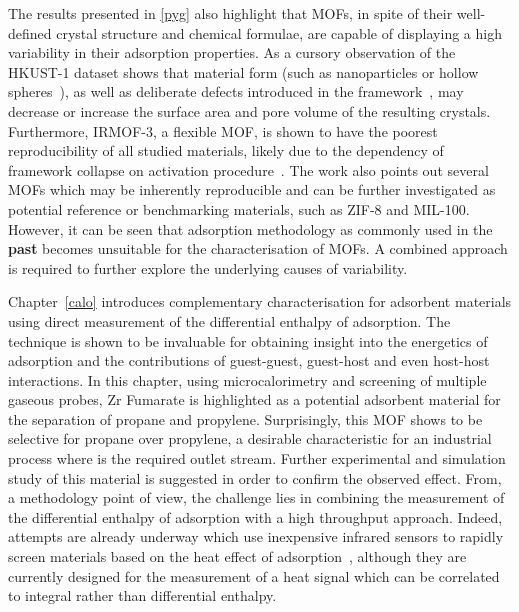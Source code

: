 The results presented in \autoref{pyg} also highlight that
\glspl{MOF}, in spite of their well-defined crystal structure and 
chemical formulae, are capable of displaying a high variability in
their adsorption properties. 
As a cursory observation of the HKUST-1 dataset shows that material 
form (such as nanoparticles or hollow
spheres~\cite{liControllableSynthesisMetal2013}), as well as 
deliberate defects introduced in the 
framework~\cite{barinDefectCreationLinker2014}, may decrease or 
increase the surface area and pore volume of the resulting crystals.
Furthermore, IRMOF-3, a flexible \gls{MOF}, 
is shown to have the poorest reproducibility of all studied materials,
likely due to the dependency of framework collapse on 
activation procedure~\cite{engelActivationDependentBreathingFlexible2017}.
The work also points out several \glspl{MOF} 
which may be inherently reproducible and can be further investigated as 
potential reference or benchmarking materials, such as 
ZIF-8 and MIL-100.
However, it can be seen that adsorption methodology as commonly used in the
\textbf{past} becomes unsuitable for the characterisation of \glspl{MOF}. 
A combined approach is required to further explore the underlying 
causes of variability.

Chapter~\ref{calo} introduces complementary characterisation 
for adsorbent materials using direct measurement of the
differential enthalpy of adsorption. The technique is shown to be 
invaluable for obtaining insight into the energetics of 
adsorption and the contributions of guest-guest, guest-host 
and even host-host interactions. In this chapter,
using microcalorimetry and screening of multiple gaseous probes,
Zr Fumarate is highlighted as a potential adsorbent material for the 
separation of propane and propylene. Surprisingly, this \gls{MOF} shows
to be selective for propane over propylene, a desirable characteristic
for an industrial process where  is the required
outlet stream. Further experimental and simulation study of this
material is suggested in order to confirm the observed effect.
From, a methodology point of view, the challenge lies in combining
the measurement of the differential enthalpy of adsorption with a 
high throughput approach. 
Indeed, attempts are already underway which use inexpensive infrared 
sensors to rapidly screen materials based on the heat effect of 
adsorption~\cite{wollmannInfrasorbOpticalDetection2012}, although
they are currently designed for the measurement of a heat signal 
which can be correlated to integral rather than differential enthalpy.

